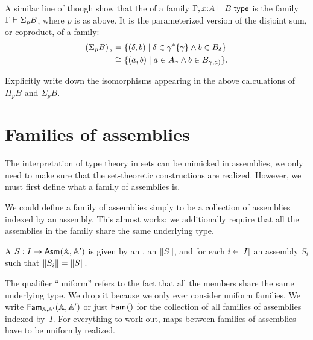 A similar line of though show that the  of a family $\Gamma, x \of A \types B \istype$ is the family $\Gamma \types \Sigma_p B$, where $p$ is as above. It is the parameterized version of the disjoint sum, or coproduct, of a family:
%
\begin{align*}
  (\Sigma_p B)_\gamma &=
  \set{ (\delta, b) \such \delta \in \invim{\gamma} \set{\gamma} \land b \in B_\delta }
  \\
  &\cong
  \set{ (a, b) \such a \in A_\gamma \land b \in B_{\gamma, a)}}.
\end{align*}

\begin{exercise}
  Explicitly write down the isomorphisms appearing in the above calculations
  of $\Pi_p B$ and $\Sigma_p B$.
\end{exercise}

\section{Families of assemblies}
\label{sec:families-assemblies}

The interpretation of type theory in sets can be mimicked in assemblies, we only need to make sure that the set-theoretic constructions are realized. However, we must first define what a family of assemblies is.

We could define a family of assemblies simply to be a collection of assemblies indexed by an assembly. This almost works: we additionally require that all the assemblies in the family share the same underlying type.

\begin{definition}
  A  $S : I \to \AsmA$ is given by an
  , an  $\T{S}$, and for each
  $i \in \S{I}$ an assembly $S_i$ such that $\T{S_i} = \T{S}$.
\end{definition}

The qualifier ``uniform'' refers to the fact that all the members share the same underlying type. We drop it because we only ever consider uniform families.
%
We write $\Fam[\AA, \subAA]{I}$ or just $\Fam{I}$ for the collection of all families of assemblies indexed by~$I$. For everything to work out, maps between families of assemblies have to be uniformly realized.

